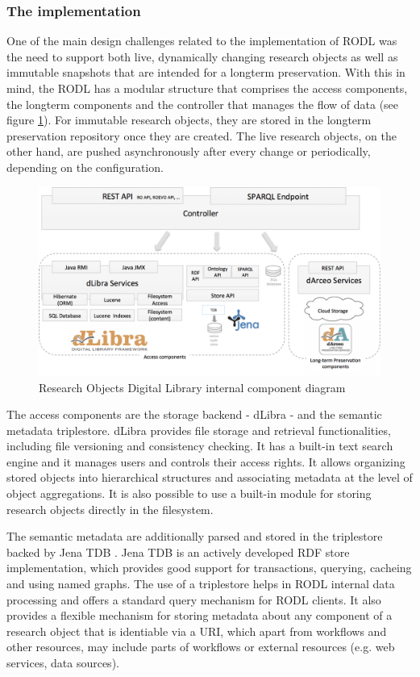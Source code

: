 \subsubsection{The implementation}

One of the main design challenges related to the implementation of RODL was the need to support both live, dynamically changing research objects as well as immutable snapshots that are intended for a longterm preservation. With this in mind, the RODL has a modular structure that comprises the access components, the longterm components and the controller that manages the flow of data (see figure \ref{RODL}). For immutable research objects, they are stored in the longterm preservation repository once they are created. The live research objects, on the other hand, are pushed asynchronously after every change or periodically, depending on the configuration.

\begin{figure}[!hb]
\centering
\includegraphics[width=\textwidth]{Figures/RODL-new.png}
\caption{Research Objects Digital Library internal component diagram}
\label{RODL}
\end{figure}


The access components are the storage backend - dLibra \cite{dLibra} - and the semantic metadata triplestore. dLibra provides file storage and retrieval functionalities, including file versioning and consistency checking. It has a built-in text search engine and it manages users and controls their access rights. It allows organizing stored objects into hierarchical structures and associating metadata at the level of object aggregations. It is also possible to use a built-in module for storing research objects directly in the filesystem.

The semantic metadata are additionally parsed and stored in the triplestore backed by Jena TDB \cite{Jena}. Jena TDB is an actively developed RDF store implementation, which provides good support for transactions, querying, cacheing and using named graphs. The use of a triplestore helps in RODL internal data processing and offers a standard query mechanism for RODL clients. It also provides a flexible mechanism for storing metadata about any component of a research object that is identiable via a URI, which apart from workflows and other resources, may include parts of workflows or external resources (e.g. web services, data sources).

